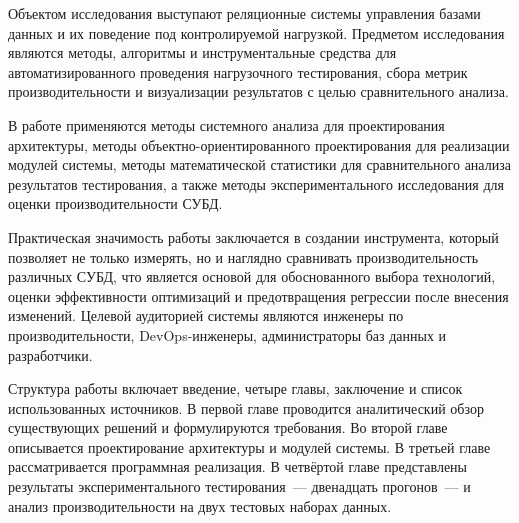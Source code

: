 Объектом исследования выступают реляционные системы управления базами данных и их поведение под контролируемой нагрузкой. Предметом исследования являются методы, алгоритмы и инструментальные средства для автоматизированного проведения нагрузочного тестирования, сбора метрик производительности и визуализации результатов с целью сравнительного анализа.

В работе применяются методы системного анализа для проектирования архитектуры, методы объектно-ориентированного проектирования для реализации модулей системы, методы математической статистики для сравнительного анализа результатов тестирования, а также методы экспериментального исследования для оценки производительности СУБД.

Практическая значимость работы заключается в создании инструмента, который позволяет не только измерять, но и наглядно сравнивать производительность различных СУБД, что является основой для обоснованного выбора технологий, оценки эффективности оптимизаций и предотвращения регрессии после внесения изменений. Целевой аудиторией системы являются инженеры по производительности, DevOps-инженеры, администраторы баз данных и разработчики.

Структура работы включает введение, четыре главы, заключение и список использованных источников. В первой главе проводится аналитический обзор существующих решений и формулируются требования. Во второй главе описывается проектирование архитектуры и модулей системы. В третьей главе рассматривается программная реализация. В четвёртой главе представлены результаты экспериментального тестирования~--- двенадцать прогонов~--- и анализ производительности на двух тестовых наборах данных.